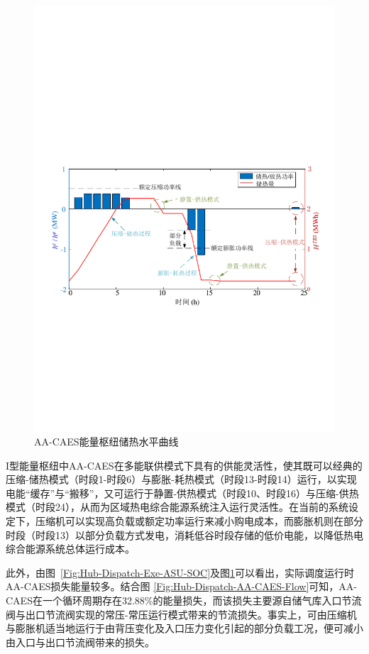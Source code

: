 \begin{figure}[H]
\centering
\includegraphics[scale=0.65]{figures/Chap4-15-Hub-Dispatch-Exe-TES-SOC-V2.pdf}
\caption{AA-CAES能量枢纽储热水平曲线}
\label{Fig:Hub-Dispatch-Exe-TES-SOC}
\end{figure}

I型能量枢纽中AA-CAES在多能联供模式下具有的供能灵活性，使其既可以经典的压缩-储热模式（时段1-时段6）与膨胀-耗热模式（时段13-时段14）运行，以实现电能“缓存”与“搬移”，又可运行于静置-供热模式（时段10、时段16）与压缩-供热模式（时段24），从而为区域热电综合能源系统注入运行灵活性。在当前的系统设定下，压缩机可以实现高负载或额定功率运行来减小购电成本，而膨胀机则在部分时段（时段13）以部分负载方式发电，消耗低谷时段存储的低价电能，以降低热电综合能源系统总体运行成本。

此外，由图~\ref{Fig:Hub-Dispatch-Exe-ASU-SOC}及图\ref{Fig:Hub-Dispatch-Exe-TES-SOC}可以看出，实际调度运行时AA-CAES损失能量较多。结合图
\ref{Fig:Hub-Dispatch-AA-CAES-Flow}可知，AA-CAES在一个循环周期存在32.88\%的能量损失，而该损失主要源自储气库入口节流阀与出口节流阀实现的常压-常压运行模式带来的节流损失。事实上，可由压缩机与膨胀机适当地运行于由背压变化及入口压力变化引起的部分负载工况，便可减小由入口与出口节流阀带来的损失。

